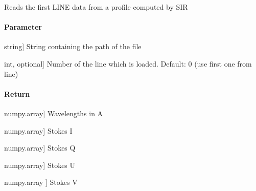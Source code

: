 \documentclass[letterpaper,10pt,english]{sphinxmanual}
\begin{document}

\begin{fulllineitems}
\label{\detokenize{functions:sir.read_profile}}
\pysigstartsignatures
{}
\pysigstopsignatures
\sphinxAtStartPar
Reads the first LINE data from a profile computed by SIR


\paragraph{Parameter}
\label{\detokenize{functions:id15}}\begin{description}
\sphinxlineitem{filename}{[}string{]}
\sphinxAtStartPar
String containing the path of the file

\sphinxlineitem{num}{[}int, optional{]}
\sphinxAtStartPar
Number of the line which is loaded. Default: 0 (use first one from line)

\end{description}


\paragraph{Return}
\label{\detokenize{functions:id16}}\begin{description}
\sphinxlineitem{ll}{[}numpy.array{]}
\sphinxAtStartPar
Wavelengths in A

\sphinxlineitem{I}{[}numpy.array{]}
\sphinxAtStartPar
Stokes I

\sphinxlineitem{Q}{[}numpy.array{]}
\sphinxAtStartPar
Stokes Q

\sphinxlineitem{U}{[}numpy.array{]}
\sphinxAtStartPar
Stokes U

\sphinxlineitem{V}{[}numpy.array {]}
\sphinxAtStartPar
Stokes V

\end{description}

\end{fulllineitems}

\end{document}
